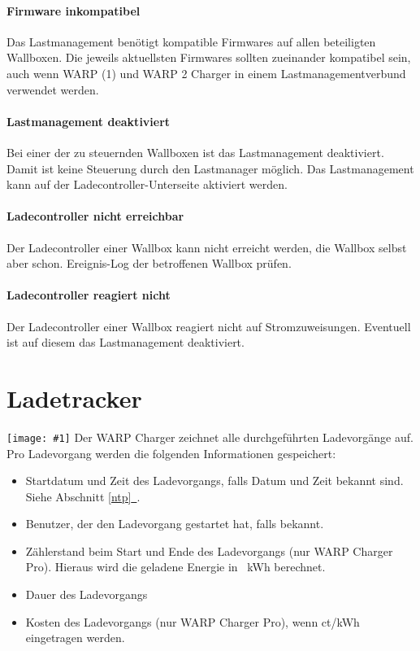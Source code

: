 \documentclass[a4paper,10pt]{article}
\newcommand{\gfx}[1]{\texttt{[image: \#1]}}
\newcommand*{\fullref}[1]{Abschnitt \hyperref[{#1}]{\ref*{#1}~\nameref*{#1}}}
\begin{document}
\begin{multicols*}{2}
    \paragraph{Firmware inkompatibel}
    Das Lastmanagement benötigt kompatible Firmwares auf allen beteiligten Wallboxen. Die jeweils aktuellsten Firmwares sollten zueinander kompatibel sein,
    auch wenn WARP (1) und WARP 2 Charger in einem Lastmanagementverbund verwendet werden.

    \paragraph{Lastmanagement deaktiviert}
    Bei einer der zu steuernden Wallboxen ist das Lastmanagement deaktiviert. Damit ist keine Steuerung durch den Lastmanager möglich. Das Lastmanagement kann auf der Ladecontroller-Unterseite aktiviert werden.

    \paragraph{Ladecontroller nicht erreichbar}
    Der Ladecontroller einer Wallbox kann nicht erreicht werden, die Wallbox selbst aber schon. Ereignis-Log der betroffenen Wallbox prüfen.

    \paragraph{Ladecontroller reagiert nicht}
    Der Ladecontroller einer Wallbox reagiert nicht auf Stromzuweisungen. Eventuell ist auf diesem das Lastmanagement deaktiviert.

    \newpage
    \section{Ladetracker}\label{charge_tracker}
    \gfx{./img_warp2/resized/web_charge_tracker}
    Der WARP Charger zeichnet alle durchgeführten Ladevorgänge auf. Pro Ladevorgang werden die folgenden Informationen gespeichert:
    \begin{itemize}
     \item Startdatum und Zeit des Ladevorgangs, falls Datum und Zeit bekannt
     sind. Siehe \fullref{ntp}.
     \item Benutzer, der den Ladevorgang gestartet hat, falls bekannt.
     \item Zählerstand beim Start und Ende des Ladevorgangs (nur WARP Charger Pro). Hieraus wird die geladene Energie in \SI{}{\kWh} berechnet.
     \item Dauer des Ladevorgangs
     \item Kosten des Ladevorgangs (nur WARP Charger Pro), wenn ct/kWh eingetragen werden.
    \end{itemize}


\end{multicols*}
\end{document}

